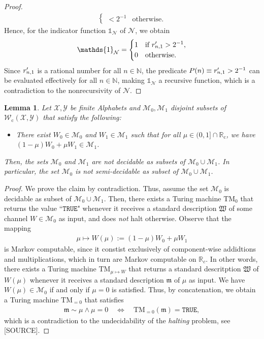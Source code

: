 \documentclass[conference]{IEEEtran}
\def\X{{\mathcal X}}
\def\Y{{\mathcal Y}}
\def\M{{\mathcal M}}
\def\N{{\mathcal N}}
\def\W{{\mathcal W}}
\def\NN{{\mathbb N}}
\def\RR{{\mathbb R}}
\newcommand{\RRc}{\RR_{\mathrm{c}}}
\newcommand{\TM}{\mathrm{TM}}
\newcommand{\rp}[1]{\mathrlap{\phantom{r}^{\prime}}r_{#1}}
\newcommand{\Wc}{\W_{\mathrm{c}}}
\newcommand{\sdummy}{{\color{red}[SOURCE]}}
\newtheorem{Lemma}[Theorem]{Lemma}
\begin{document}
\begin{proof}
\begin{align}
\begin{cases}
																< 2^{-1} 	&\text{otherwise}.
												\end{cases} 
					\end{align}
					Hence, for the indicator function \(\mathds{1}_\N\) of \(\N\), we obtain
					\begin{align}	\mathds{1}_\N =		\begin{cases}	1	&\text{if}~\rp{n,1} > 2^{-1}, \\
																		0	&\text{otherwise}.
														\end{cases} 
					\end{align}
					Since \(\rp{n,1}\) is a rational number for all \(n\in\NN\), the predicate \(P(n) \equiv  \rp{n,1} > 2^{-1}\) can be
					evaluated effectively for all \(n\in\NN\), making \(\mathds{1}_\N\) a recursive function, which is a contradiction to the nonrecursivity of \(\N\).			
	\end{proof}
	\begin{Lemma}	\label{lem:SubsetNotSemidecidable}
					Let \(\X,\Y\) be finite Alphabets and \(\M_0, \M_1\) disjoint subsets of \(\Wc(\X,\Y)\) that satisfy the following:
					\begin{itemize}	\item There exist \(W_0\in\M_0\) and \(W_1\in\M_1\) such that for all \(\mu \in (0,1]\cap \RRc\), 													
										we have \((1-\mu)W_0 + \mu W_1 \in \M_1\). 
					\end{itemize}
					Then, the sets \(\M_0\) and \(\M_1\) are \emph{not} decidable as subsets of \(\M_0 \cup \M_1\). In particular, the set 
					\(\M_0\) is \emph{not} semi-decidable as subset of \(\M_0 \cup \M_1\).
	\end{Lemma}\begin{proof}
					We prove the claim by contradiction. Thus, assume the set \(\M_0\) is decidable as subset of \(\M_0 \cup \M_1\). 
					Then, there exists a Turing machine \(\TM_0\) that returns the value ``\(\mathtt{TRUE}\)" whenever it receives a standard description
					\(\mathfrak{W}\) of some channel \(W\in \M_0\) as input, and does \emph{not} halt otherwise. Observe that the mapping
					\begin{align}	\mu \mapsto W(\mu) := (1-\mu)W_0 + \mu W_1
					\end{align} 
					is Markov computable, since it constist exclusively of component-wise addidtions and multiplications, which in turn are Markov computable on \(\RR_c\).
					In other words, there exists a Turing machine \(\TM_{\mu\mapsto W}\) that returns a standard descritption \(\mathfrak{W}\) of 
					\(W(\mu)\) whenever it receives a standard description \(\mathfrak{m}\) of \(\mu\) as input. We have \(W(\mu) \in \M_0\) if and only if
					\(\mu = 0\) is satisfied. Thus, by concatenation, we obtain a Turing machine
					\(\TM_{=0}\) that satisfies
					\begin{align}	\mathfrak{m} \sim \mu \wedge \mu = 0	\quad\Leftrightarrow\quad  \TM_{=0}(\mathfrak{m}) = \mathtt{TRUE},
					\end{align}
					which is a contradiction to the undecidability of the \emph{halting} problem, see \sdummy.
	\end{proof}
	
\end{document}
